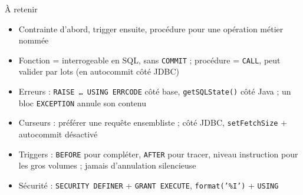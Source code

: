 \documentclass[aspectratio=169,10pt]{beamer}
\begin{document}
\begin{frame}{\`A retenir}
  \begin{itemize}
    \item Contrainte d'abord, trigger ensuite, proc\'edure pour une op\'eration m\'etier nomm\'ee
    \item Fonction = interrogeable en SQL, sans \texttt{COMMIT} ; proc\'edure = \texttt{CALL}, peut valider par lots (en autocommit c\^ot\'e JDBC)
    \item Erreurs : \texttt{RAISE \ldots{} USING ERRCODE} c\^ot\'e base, \texttt{getSQLState()} c\^ot\'e Java ; un bloc \texttt{EXCEPTION} annule son contenu
    \item Curseurs : pr\'ef\'erer une requ\^ete ensembliste ; c\^ot\'e JDBC, \texttt{setFetchSize} + autocommit d\'esactiv\'e
    \item Triggers : \texttt{BEFORE} pour compl\'eter, \texttt{AFTER} pour tracer, niveau instruction pour les gros volumes ; jamais d'annulation silencieuse
    \item S\'ecurit\'e : \texttt{SECURITY DEFINER} + \texttt{GRANT EXECUTE}, \texttt{format('\%I')} + \texttt{USING}
  \end{itemize}
\end{frame}

\rquestionslide
\end{document}
